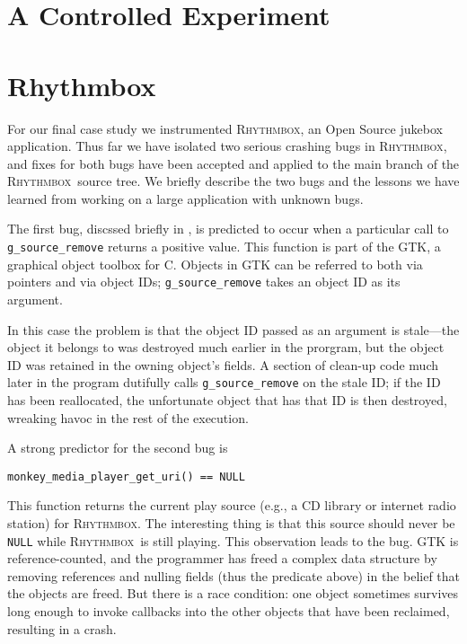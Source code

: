 \documentclass[10pt]{acmconfbig}
\newcommand{\rhythmbox}{\textsc{Rhythmbox}\xspace}
\begin{document}
\section{A Controlled Experiment}
\label{sec:experiments:results}



\section{Rhythmbox}
\label{sec:rb}


For our final case study we instrumented \rhythmbox, an Open Source
jukebox application.  Thus far we have isolated two serious crashing
bugs in \rhythmbox, and fixes for both bugs have been accepted and
applied to the main branch of the \rhythmbox\ source tree.  We briefly
describe the two bugs and the lessons we have learned from working on
a large application with unknown bugs.

The first bug, discssed briefly in , is
predicted to occur when a particular call to {\tt g\_source\_remove}
returns a positive value.  This function is part of the GTK, a graphical
object toolbox for C.
Objects in GTK can be referred to both
via pointers and via object IDs; {\tt g\_source\_remove}
takes an object ID as its argument.

In this case the problem is that the object ID passed as an argument
is stale---the object it belongs to was destroyed much earlier in the
prorgram, but the object ID was retained in the owning object's fields.
A section of clean-up code much later in the program dutifully calls {\tt g\_source\_remove} on the
stale ID; if the ID has been reallocated, the unfortunate object that
has that ID is then destroyed, wreaking havoc in the rest of the execution.

A strong predictor for the second bug is 
\begin{verbatim}
monkey_media_player_get_uri() == NULL 
\end{verbatim} 
This function
returns the current play source (e.g., a CD library or internet radio
station) for \rhythmbox.  The interesting thing is that this source
should never be {\tt NULL} while \rhythmbox\ is still playing.  This
observation leads to the bug.  GTK is reference-counted, and the
programmer has freed a complex data structure by removing references
and nulling fields (thus the predicate above) in the belief that the objects are freed. But there
is a race condition: one object sometimes survives long enough to
invoke callbacks into the other objects that have been reclaimed,
resulting in a crash.
\end{document}
